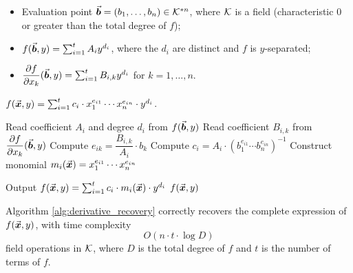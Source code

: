 \documentclass{article}
\numberwithin{equation}{section}
\begin{document}
\begin{algorithm}
\caption{Derivative-Based Polynomial Recovery Algorithm}
\label{alg:derivative_recovery}
\begin{algorithmic}[1]
\Require
    \begin{itemize}
        \item Evaluation point $\vec{\boldsymbol{b}} = (b_1, \dots, b_n) \in {\mathcal{K}}^{*n}$, where ${\mathcal{K}}$ is a field (characteristic $0$ or greater than the total degree of $f$);
        \item $f(\vec{\boldsymbol{b}}, y) = \sum_{i=1}^{t} A_i y^{d_i}$, where the $d_i$ are distinct and $f$ is $y$-separated;
        \item $\dfrac{\partial f}{\partial x_k}(\vec{\boldsymbol{b}}, y) = \sum_{i=1}^{t} B_{i,k} y^{d_i}$ for $k = 1, \dots, n$.
    \end{itemize}
\Ensure 
    $f(\vec{\boldsymbol{x}}, y) = \sum_{i=1}^{t} c_i \cdot x_1^{e_{i1}} \cdots x_n^{e_{in}} \cdot y^{d_i}$.

    \State Read coefficient $A_i$ and degree $d_i$ from $f(\vec{\boldsymbol{b}},y)$
        \State Read coefficient $B_{i,k}$ from $\dfrac{\partial f}{\partial x_k}(\vec{\boldsymbol{b}},y)$
        \State Compute $e_{ik} = \dfrac{B_{i,k}}{A_i} \cdot b_k$
    \EndFor
    \State Compute $c_i = A_i \cdot \left( b_1^{e_{i1}} \cdots b_n^{e_{in}} \right)^{-1}$
    \State Construct monomial $m_i(\vec{\boldsymbol{x}}) = x_1^{e_{i1}} \cdots x_n^{e_{in}}$
\EndFor

\State Output $f(\vec{\boldsymbol{x}},y) = \sum_{i=1}^{t} c_i \cdot m_i(\vec{\boldsymbol{x}}) \cdot y^{d_i}$
\State \Return $f(\vec{\boldsymbol{x}},y)$
\end{algorithmic}
\end{algorithm}



\begin{theorem}\label{the-2}
Algorithm \ref{alg:derivative_recovery} correctly recovers the complete expression of $f(\vec{\boldsymbol{x}}, y)$, with time complexity
\[
O(n \cdot t \cdot \log D)
\]
field operations in ${\mathcal{K}}$, where $D$ is the total degree of $f$ and $t$ is the number of terms of $f$.
\end{theorem}
\end{document}
